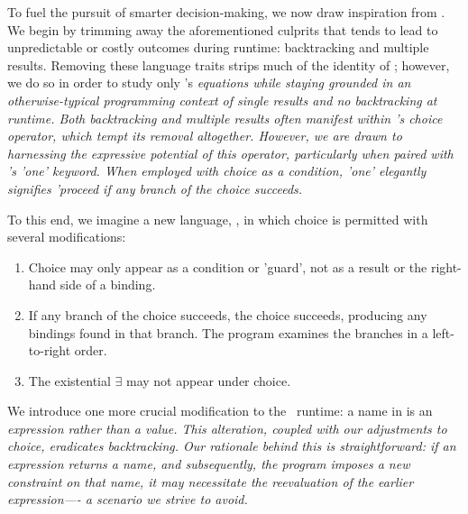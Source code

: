 \documentclass[article,screen,12pt, nonacm]{acmart}
\begin{document}
        To fuel the pursuit of smarter decision-making, we now draw inspiration
        from \VC. We begin by trimming away the aforementioned culprits that
        tends to lead to unpredictable or costly outcomes during runtime:
        backtracking and multiple results. Removing these language traits strips
        much of the identity of \VC; however, we do so in order to study only
        \VC's \it{equations} while staying grounded in an otherwise-typical
        programming context of single results and no backtracking at runtime.
        Both backtracking and multiple results often manifest within \VC's
        choice operator, which tempt its removal altogether. However, we are drawn
        to harnessing the expressive potential of this operator, particularly
        when paired with \VC's 'one' keyword. When employed with choice as a
        condition, 'one' elegantly signifies 'proceed if any branch of the
        choice succeeds. 
        
        To this end, we imagine a new language, \VMinus, in which choice is
        permitted with several modifications:

        \begin{enumerate}
        \item Choice may only appear as a condition or 'guard', not as a result
        or the right-hand side of a binding.
        \item If any branch of the choice succeeds, the choice succeeds,
        producing any bindings found in that branch. The program examines the
        branches in a left-to-right order.
        \item The existential $\exists$ may not appear under choice.
        \end{enumerate}

        We introduce one more crucial modification to the \VC\ runtime: a name in
        \VMinus is an \it{expression} rather than a \it{value}. This alteration,
        coupled with our adjustments to choice, eradicates backtracking. Our
        rationale behind this is straightforward: if an expression returns a
        name, and subsequently, the program imposes a new constraint on that
        name, it may necessitate the reevaluation of the earlier expression—- a
        scenario we strive to avoid. 
        


        
\end{document}
